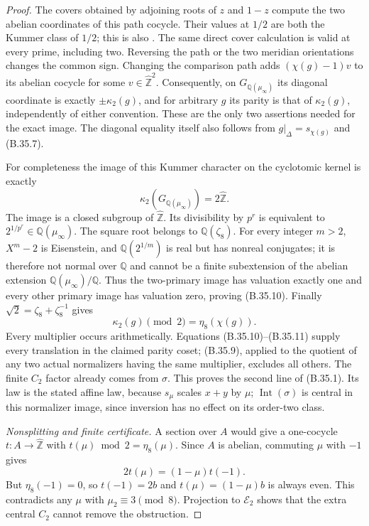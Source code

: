 \begin{proof}
The covers obtained by adjoining roots of $z$ and $1-z$
compute the two abelian coordinates of this path cocycle.
Their values at $1/2$ are both the Kummer class of $1/2$;
this is also \citet[Lemma 3.16]{FA_Wickelgren2012}.
The same direct cover calculation is valid at every prime,
including two.  Reversing the path or the two meridian
orientations changes the common sign.  Changing the comparison
path adds $(\chi(g)-1)v$ to its abelian cocycle for some
$v\in\widehat{\mathbb Z}^2$.  Consequently, on
$G_{\mathbb Q(\mu_\infty)}$ its diagonal coordinate is
exactly $\pm\kappa_2(g)$, and for arbitrary $g$ its parity
is that of $\kappa_2(g)$, independently of either convention.
These are the only two assertions needed for the exact image.
The diagonal equality itself also follows from
$g|_\Delta=s_{\chi(g)}$ and (B.35.7).

For completeness the image of this Kummer character on the
cyclotomic kernel is exactly
\[
          \kappa_2(G_{\mathbb Q(\mu_\infty)})
                              =2\widehat{\mathbb Z}.      \tag{B.35.10}
\]
The image is a closed subgroup of $\widehat{\mathbb Z}$.
Its divisibility by $p^r$ is equivalent to
$2^{1/p^r}\in\mathbb Q(\mu_\infty)$.
The square root belongs to $\mathbb Q(\zeta_8)$.
For every integer $m>2$, $X^m-2$ is Eisenstein, and
$\mathbb Q(2^{1/m})$ is real but has nonreal conjugates;
it is therefore not normal over $\mathbb Q$ and cannot
be a finite subextension of the abelian extension
$\mathbb Q(\mu_\infty)/\mathbb Q$.  Thus the two-primary
image has valuation exactly one and every other primary
image has valuation zero, proving (B.35.10).
Finally
$\sqrt2=\zeta_8+\zeta_8^{-1}$ gives
\[
        \kappa_2(g)\pmod2=\eta_8(\chi(g)).                \tag{B.35.11}
\]
Every multiplier occurs arithmetically.  Equations
(B.35.10)--(B.35.11) supply every translation in the claimed
parity coset; (B.35.9), applied to the quotient of any two
actual normalizers having the same multiplier, excludes all
others.  The finite $C_2$ factor already comes from $\sigma$.
This proves the second line of (B.35.1).  Its law is the
stated affine law, because $s_\mu$ scales $x+y$ by $\mu$;
$\operatorname{Int}(\sigma)$ is central in this normalizer
image, since inversion has no effect on its order-two class.

\emph{Nonsplitting and finite certificate.}
A section over $A$ would give a one-cocycle $t:A\to\widehat{\mathbb Z}$
with $t(\mu)\bmod2=\eta_8(\mu)$.  Since $A$ is abelian,
commuting $\mu$ with $-1$ gives
\[
                  2t(\mu)=(1-\mu)t(-1).
\]
But $\eta_8(-1)=0$, so $t(-1)=2b$ and
$t(\mu)=(1-\mu)b$ is always even.  This contradicts any
$\mu$ with $\mu_2\equiv3\pmod8$.  Projection to
$\mathcal E_2$ shows that the extra central $C_2$ cannot
remove the obstruction.


\end{proof}
